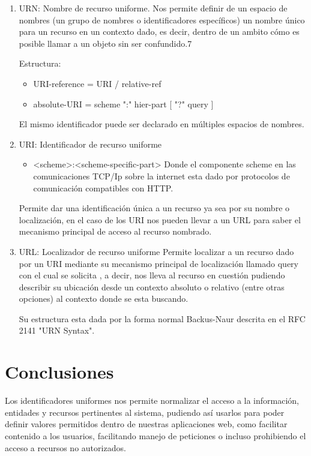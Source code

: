 \documentclass[12pt]{article}
\begin{document}
\begin{enumerate}
\item{URN: Nombre de recurso uniforme.  }
Nos permite definir de un espacio de nombres (un grupo de nombres o identificadores específicos) un nombre único para un recurso
en un contexto dado, es decir, dentro de un ambito cómo es posible llamar a un objeto sin ser confundido.7

Estructura:
\begin{itemize}
\item{URI-reference = URI / relative-ref}
\item{absolute-URI  = scheme ":" hier-part [ "?" query ]}
\end{itemize}

El mismo identificador puede ser declarado en múltiples espacios de nombres.
\item{URI: Identificador de recurso uniforme}
\begin{itemize}
\item{<scheme>:<scheme-specific-part>}
Donde el componente scheme en las comunicaciones TCP/Ip sobre la internet esta dado por protocolos de comunicación compatibles con HTTP.
\end{itemize}
Permite dar una identificación única a un recurso ya sea por su nombre o localización, en el caso de los URI nos pueden llevar a un URL para saber
el mecanismo principal de acceso al recurso nombrado.

\item{URL: Localizador de recurso uniforme}
Permite localizar a un recurso dado por un URI mediante su mecanismo principal de localización llamado query con el cual se solicita , a decir, nos lleva al recurso en cuestión pudiendo describir
su ubicación desde un contexto absoluto o relativo (entre otras opciones) al contexto donde se esta buscando.

Su estructura esta dada por la forma normal Backus-Naur descrita en el RFC 2141 "URN Syntax".


\end{enumerate}




\section{Conclusiones}
Los identificadores uniformes nos permite normalizar el acceso a la información, entidades y recursos pertinentes al sistema, pudiendo así usarlos
para poder definir valores permitidos dentro de nuestras aplicaciones web, como facilitar contenido a los usuarios, facilitando manejo de peticiones o incluso
prohibiendo el acceso a recursos no autorizados.
\end{document}

